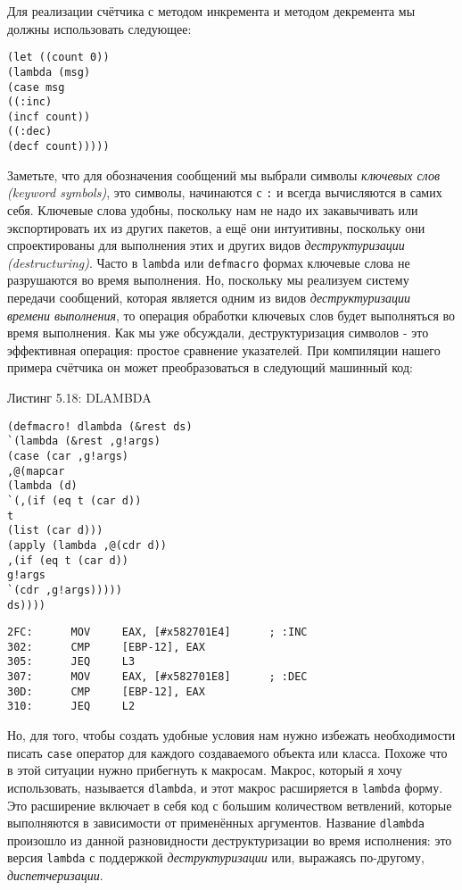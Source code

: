 Для реализации счётчика с методом инкремента и методом декремента мы должны использовать следующее:

\begin{verbatim}
(let ((count 0))
(lambda (msg)
(case msg
((:inc)
(incf count))
((:dec)
(decf count)))))
\end{verbatim}

Заметьте, что для обозначения сообщений мы выбрали символы \emph{ключевых слов (keyword symbols)}, это символы, начинаются с \verb":" и всегда вычисляются в самих себя. Ключевые слова удобны, поскольку нам не надо их закавычивать или экспортировать их из других пакетов, а ещё они интуитивны, поскольку они спроектированы для выполнения этих и других видов \emph{деструктуризации (destructuring)}. Часто в \verb"lambda" или \verb"defmacro" формах ключевые слова не разрушаются во время выполнения. Но, поскольку мы реализуем систему передачи сообщений, которая является одним из видов \emph{деструктуризации времени выполнения}, то операция обработки ключевых слов будет выполняться во время выполнения. Как мы уже обсуждали, деструктуризация символов - это эффективная операция: простое сравнение указателей. При компиляции нашего примера счётчика он может преобразоваться в следующий машинный код:

Листинг 5.18: DLAMBDA\label{listing_5.18}
\listbegin
\begin{verbatim}
(defmacro! dlambda (&rest ds)
`(lambda (&rest ,g!args)
(case (car ,g!args)
,@(mapcar
(lambda (d)
`(,(if (eq t (car d))
t
(list (car d)))
(apply (lambda ,@(cdr d))
,(if (eq t (car d))
g!args
`(cdr ,g!args)))))
ds))))
\end{verbatim}
\listend

\begin{verbatim}
2FC:      MOV     EAX, [#x582701E4]      ; :INC
302:      CMP     [EBP-12], EAX
305:      JEQ     L3
307:      MOV     EAX, [#x582701E8]      ; :DEC
30D:      CMP     [EBP-12], EAX
310:      JEQ     L2
\end{verbatim}

Но, для того, чтобы создать удобные условия нам нужно избежать необходимости писать \verb"case" оператор для каждого создаваемого объекта или класса. Похоже что в этой ситуации нужно прибегнуть к макросам. Макрос, который я хочу использовать, называется \verb"dlambda", и этот макрос расширяется в \verb"lambda" форму. Это расширение включает в себя код с большим количеством ветвлений, которые выполняются в зависимости от применённых аргументов. Название \verb"dlambda" произошло из данной разновидности деструктуризации во время исполнения: это версия \verb"lambda" с поддержкой \emph{деструктуризации} или, выражаясь по-другому, \emph{диспетчеризации}.

